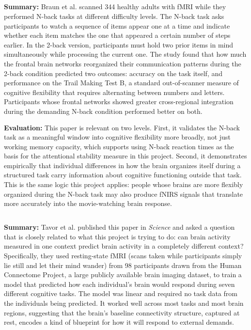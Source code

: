 \documentclass[12pt]{article}
\begin{document}
\subsection*{\cite{braun2015}}
\textbf{Summary:} Braun et al. scanned 344 healthy adults with fMRI while they performed N-back tasks at different difficulty levels. The N-back task asks participants to watch a sequence of items appear one at a time and indicate whether each item matches the one that appeared a certain number of steps earlier. In the 2-back version, participants must hold two prior items in mind simultaneously while processing the current one. The study found that how much the frontal brain networks reorganized their communication patterns during the 2-back condition predicted two outcomes: accuracy on the task itself, and performance on the Trail Making Test B, a standard out-of-scanner measure of cognitive flexibility that requires alternating between numbers and letters. Participants whose frontal networks showed greater cross-regional integration during the demanding N-back condition performed better on both.

\textbf{Evaluation:} This paper is relevant on two levels. First, it validates the N-back task as a meaningful window into cognitive flexibility more broadly, not just working memory capacity, which supports using N-back reaction times as the basis for the attentional stability measure in this project. Second, it demonstrates empirically that individual differences in how the brain organizes itself during a structured task carry information about cognitive functioning outside that task. This is the same logic this project applies: people whose brains are more flexibly organized during the N-back task may also produce fNIRS signals that translate more accurately into the movie-watching brain response.

\subsection*{\cite{tavor2016}}
\textbf{Summary:} Tavor et al. published this paper in \textit{Science} and asked a question that is closely related to what this project is trying to do: can brain activity measured in one context predict brain activity in a completely different context? Specifically, they used resting-state fMRI (scans taken while participants simply lie still and let their mind wander) from 98 participants drawn from the Human Connectome Project, a large publicly available brain imaging dataset, to train a model that predicted how each individual's brain would respond during seven different cognitive tasks. The model was linear and required no task data from the individuals being predicted. It worked well across most tasks and most brain regions, suggesting that the brain's baseline connectivity structure, captured at rest, encodes a kind of blueprint for how it will respond to external demands.
\end{document}
